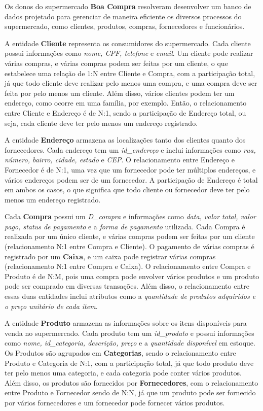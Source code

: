 \documentclass{article}
\begin{document}
\begin{flushleft}

Os donos do supermercado \textbf{Boa Compra} resolveram desenvolver um banco de dados projetado para gerenciar de maneira eficiente os diversos processos do supermercado, como clientes, produtos, compras, fornecedores e funcionários.

A entidade \textbf{Cliente} representa os consumidores do supermercado. Cada cliente possui informações como \textit{nome, CPF, telefone} e \textit{email}. Um cliente pode realizar várias compras, e várias compras podem ser feitas por um cliente, o que estabelece uma relação de 1:N entre Cliente e Compra, com a participação total, já que todo cliente deve realizar pelo menos uma compra, e uma compra deve ser feita por pelo menos um cliente. Além disso, vários clientes podem ter um endereço, como ocorre em uma família, por exemplo. Então, o relacionamento entre Cliente e Endereço é de N:1, sendo a participação de Endereço total, ou seja, cada cliente deve ter pelo menos um endereço registrado.

A entidade \textbf{Endereço} armazena as localizações tanto dos clientes quanto dos fornecedores. Cada endereço tem um \textit{id\_endereço} e inclui informações como \textit{rua, número, bairro, cidade, estado} e \textit{CEP}. O relacionamento entre Endereço e Fornecedor é de N:1, uma vez que um fornecedor pode ter múltiplos endereços, e vários endereços podem ser de um fornecedor. A participação de Endereço é total em ambos os casos, o que significa que todo cliente ou fornecedor deve ter pelo menos um endereço registrado.

Cada \textbf{Compra} possui um \textit{D\_compra} e informações como \textit{data, valor total, valor pago, status de pagamento} e a \textit{forma de pagamento} utilizada. Cada Compra é realizada por um único cliente, e várias compras podem ser feitas por um cliente (relacionamento N:1 entre Compra e Cliente). O pagamento de várias compras é registrado por um \textbf{Caixa}, e um caixa pode registrar várias compras (relacionamento N:1 entre Compra e Caixa). O relacionamento entre Compra e Produto é de N:M, pois uma compra pode envolver vários produtos e um produto pode ser comprado em diversas transações. Além disso, o relacionamento entre essas duas entidades inclui atributos como a \textit{quantidade de produtos adquiridos e o preço unitário de cada item}.

A entidade \textbf{Produto} armazena as informações sobre os itens disponíveis para venda no supermercado. Cada produto tem um \textit{id\_produto} e possui informações como \textit{nome, id\_categoria, descrição, preço} e a \textit{quantidade disponível} em estoque. Os Produtos são agrupados em \textbf{Categorias}, sendo o relacionamento entre Produto e Categoria de N:1, com a participação total, já que todo produto deve ter pelo menos uma categoria, e cada categoria pode conter vários produtos. Além disso, os produtos são fornecidos por \textbf{Fornecedores}, com o relacionamento entre Produto e Fornecedor sendo de N:N, já que um produto pode ser fornecido por vários fornecedores e um fornecedor pode fornecer vários produtos.


\end{flushleft}
\end{document}
